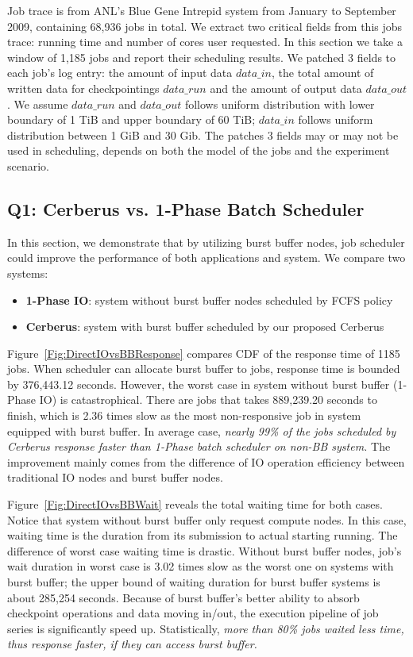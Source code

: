 Job trace is from ANL's Blue Gene Intrepid system
from January to September 2009\cite{JobTrace}, containing 68,936 jobs in total.
We extract two critical fields from this jobs trace: running time and
number of cores user requested.
In this section we take a window of 1,185 jobs and report their scheduling results.
We patched 3 fields to each job's log entry: the amount of input data $data\_in$,
the total amount of written data for checkpointings $data\_run$
and the amount of output data $data\_out$.
We assume $data\_run$ and $data\_out$ follows uniform distribution with
lower boundary of 1 TiB and upper boundary of 60 TiB;
$data\_in$ follows uniform distribution between 1 GiB and 30 Gib.
The patches 3 fields may or may not be used in scheduling,
depends on both the model of the jobs and the experiment scenario.


\subsection{Q1: Cerberus vs. 1-Phase Batch Scheduler}
\label{Sec:Sim:DirectIOvsBB}
In this section, we demonstrate that by utilizing burst buffer nodes,
job scheduler could improve the performance of both applications and system.
We compare two systems:
\begin{itemize}
        \item \textbf{1-Phase IO}: system without burst buffer nodes
                scheduled by FCFS policy
        \item \textbf{Cerberus}: system with burst buffer 
                scheduled by our proposed Cerberus
\end{itemize}

Figure~\ref{Fig:DirectIOvsBBResponse} compares CDF of the response time of 1185 jobs.
When scheduler can allocate burst buffer to jobs,
response time is bounded by 376,443.12 seconds.
However, the worst case in system without burst buffer
(1-Phase IO) is catastrophical.
There are jobs that takes 889,239.20 seconds to finish,
which is 2.36 times slow as the most non-responsive job
in system equipped with burst buffer.
In average case, \textit{nearly 99\% of the jobs scheduled by Cerberus
response faster than 1-Phase batch scheduler on non-BB system.}
The improvement mainly comes from the difference of IO operation efficiency between
traditional IO nodes and burst buffer nodes.

Figure~\ref{Fig:DirectIOvsBBWait} reveals the total waiting time for both cases.
Notice that system without burst buffer only request compute nodes.
In this case, waiting time is the duration from its submission
to actual starting running.
The difference of worst case waiting time is drastic.
Without burst buffer nodes, job's wait duration in worst case is 3.02 times
slow as the worst one on systems with burst buffer;
the upper bound of waiting duration for burst buffer systems is about 285,254 seconds.
Because of burst buffer's better ability to
absorb checkpoint operations and data moving in/out,
the execution pipeline of job series is significantly speed up.
Statistically, \textit{more than 80\% jobs waited less time, thus response faster,
if they can access burst buffer.}



